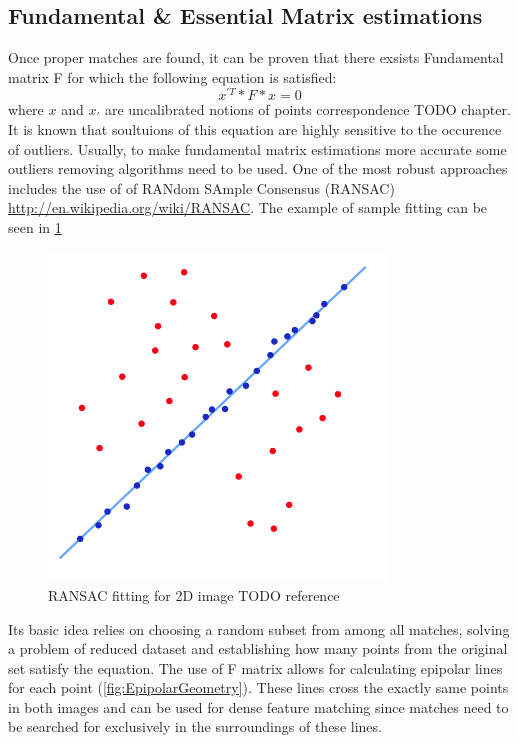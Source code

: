 \subsection{Fundamental \& Essential Matrix estimations}
Once proper matches are found, it can be proven that there exsists Fundamental matrix F for which the following equation is satisfied:
\begin{equation} \label{eq:fundamntalEquation}
{x}^{'T} * F * x = 0
\end{equation} 
where $x$ and ${x}_{'}$ are uncalibrated notions of points correspondence \cite{HartletMultipleView}TODO chapter. It is known that soultuions of this equation are highly sensitive to the occurence of outliers. Usually, to make fundamental matrix estimations more accurate some outliers removing algorithms need to be used. One of the most robust approaches includes the use of of RANdom SAmple Consensus (RANSAC) \url{http://en.wikipedia.org/wiki/RANSAC}. The example of sample fitting can be seen in \ref{fig:RANSACFitting}
\begin{figure}[p]
    \centering
    \includegraphics[width=0.8\textwidth]{RANSACFitting}
    \caption{RANSAC fitting for 2D image TODO reference}
    \label{fig:RANSACFitting}
\end{figure}
Its basic idea relies on choosing a random subset from among all matches, solving a problem of reduced dataset and establishing how many points from the original set satisfy the equation.
The use of F matrix allows for calculating epipolar lines for each point (\ref{fig:EpipolarGeometry}). These lines cross the exactly same points in both images and can be used for dense feature matching since matches need to be searched for exclusively in the surroundings of these lines.
